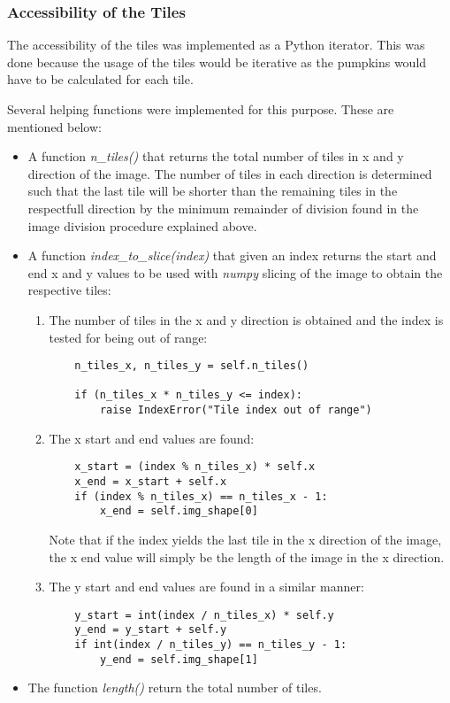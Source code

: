 \documentclass[../Head/Main.tex]{subfiles}
\begin{document}
\subsubsection{Accessibility of the Tiles}
The accessibility of the tiles was implemented as a Python iterator. This was done because the usage of the tiles would be iterative as the pumpkins would have to be calculated for each tile.\par
Several helping functions were implemented for this purpose. These are mentioned below:
\begin{itemize}
\item A function \textit{n\_tiles()} that returns the total number of tiles in x and y direction of the image. The number of tiles in each direction is determined such that the last tile will be shorter than the remaining tiles in the respectfull direction by the minimum remainder of division found in the image division procedure explained above.
\item A function \textit{index\_to\_slice(index)} that given an index returns the start and end x and y values to be used with \textit{numpy} slicing of the image to obtain the respective tiles:
\begin{enumerate}
\item The number of tiles in the x and y direction is obtained and the index is tested for being out of range:
\begin{verbatim}
    n_tiles_x, n_tiles_y = self.n_tiles()

    if (n_tiles_x * n_tiles_y <= index):
        raise IndexError("Tile index out of range")
\end{verbatim}
\item The x start and end values are found:
\begin{verbatim}
    x_start = (index % n_tiles_x) * self.x
    x_end = x_start + self.x
    if (index % n_tiles_x) == n_tiles_x - 1:
    	x_end = self.img_shape[0]
\end{verbatim}
Note that if the index yields the last tile in the x direction of the image, the x end value will simply be the length of the image in the x direction.
\item The y start and end values are found in a similar manner:
\begin{verbatim}
    y_start = int(index / n_tiles_x) * self.y
    y_end = y_start + self.y
    if int(index / n_tiles_y) == n_tiles_y - 1:
        y_end = self.img_shape[1]

\end{verbatim}
\end{enumerate}
\item The function \textit{length()} return the total number of tiles.
\end{itemize}
\end{document}
